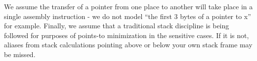 We assume the transfer of a pointer from one place to another will take place in a single assembly instruction - we do not model ``the first 3 bytes of a pointer to x'' for example.
Finally, we assume that a traditional stack discipline is being followed for purposes of points-to minimization in the sensitive cases.
If it is not, aliases from stack calculations pointing above or below your own stack frame may be missed.

